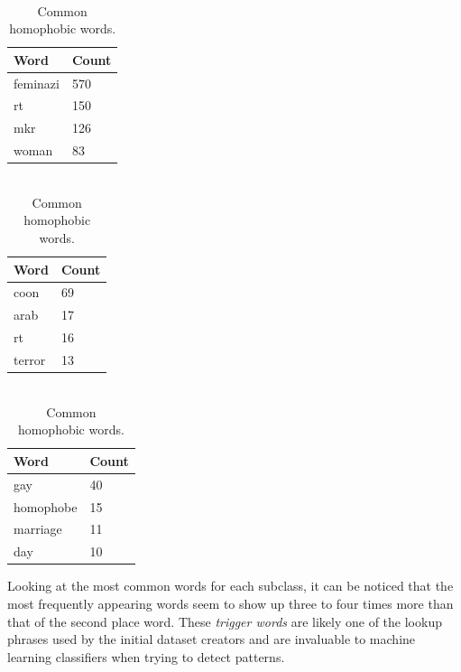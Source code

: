 \documentclass[conference]{IEEEtran}
\begin{document}
\begin{table}[H]
\parbox{.32\linewidth}{
\centering
\begin{tabular}{|l|l|}
\hline
{} Word & Count  \\ \hline
feminazi    &   570 \\ \hline
rt          &   150 \\ \hline
mkr         &   126 \\ \hline
woman       &   83 \\ \hline
\end{tabular}
\caption{\label{tab:sexism-hate-words}\\Common \\sexist words.}
}
\parbox{.32\linewidth}{
\centering
\begin{tabular}{|l|l|}
\hline
{} Word & Count  \\ \hline
coon   &    69 \\ \hline
arab   &    17 \\ \hline
rt     &    16 \\ \hline
terror &    13 \\ \hline
\end{tabular}
\caption{\label{tab:racism-hate-words}\\Common \\racist words.}
}
\parbox{.32\linewidth}{
\centering
\begin{tabular}{|l|l|}
\hline
{} Word & Count  \\ \hline
gay        &  40 \\ \hline
homophobe  &  15 \\ \hline
marriage   &  11 \\ \hline
day        &  10 \\ \hline
\end{tabular}
\caption{\label{tab:homophobic-hate-words}\\Common \\homophobic words.}
}
\end{table}

Looking at the most common words for each subclass, it can be noticed that the most frequently appearing words seem to show up three to four times more than that of the second place word. These \textit{trigger words} are likely one of the lookup phrases used by the initial dataset creators and are invaluable to machine learning classifiers when trying to detect patterns.
\end{document}
